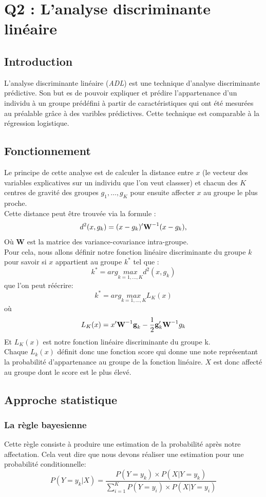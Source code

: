 \section{Q2 : L'analyse discriminante linéaire}
\subsection{Introduction}
L'analyse discriminante linéaire (\emph{ADL}) est une technique d'analyse discriminante prédictive. Son but es de pouvoir expliquer et prédire l'appartenance d'un individu à un groupe prédéfini à partir de caractéristiques qui ont été mesurées au préalable grâce à des varibles prédictives. Cette technique est comparable à la régression logistique.
\subsection{Fonctionnement}
Le principe de cette analyse est de calculer la distance entre $x$ (le vecteur des variables explicatives sur un individu que l'on veut classser) et chacun des $K$ centres de gravité des groupes $g_1,\ldots,g_K$ pour ensuite affecter $x$ au groupe le plus proche.\\
Cette distance peut être trouvée via la formule :
\[
	d^2(x,g_k) = (x - g_k)'\text{\bf W}^{-1}(x - g_k)\text{,}
\]
Où {\bf W} est la matrice des variance-covariance intra-groupe.\\
Pour cela, nous allons définir notre fonction linéaire discriminante du groupe $k$ pour savoir si $x$ appartient au groupe $k^*$ tel que :
\[
	k^* = arg \underset{k = 1,...,K}{max} d^2(x,g_k)
\]
que l'on peut réécrire:
\[
	k^* = arg \underset{k = 1,...,K}{max} L_K(x)
\]
où 
\[
	L_K(x) = x'\text{\bf W}^{-1}\text{\bf g}_k - \frac{1}{2}\text{\bf g}'_k\text{\bf W}^{-1}g_k
\]
Et $L_K(x)$ est notre fonction linéaire discriminante du groupe k.\\
Chaque $L_k(x)$ définit donc une fonction score qui donne une note représentant la probabilité d'appartenance au groupe de la fonction linéaire. $X$ est donc affecté au groupe dont le score est le plus élevé.
\subsection{Approche statistique}
\subsubsection{La règle bayesienne}
	Cette règle consiste à produire une estimation de la probabilité après notre affectation.
	Cela veut dire que nous devons réaliser une estimation pour une probabilité conditionnelle:
	\[
	P(Y = y_k | X) = \frac{P(Y = y_k) \times P(X| Y = y_k)}{\sum_{i=1}^{K} P(Y = y_i)\times P(X|Y = y_i)}
	\]
	
